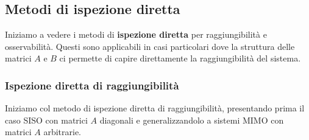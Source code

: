 \documentclass[a4paper,11pt]{article}
\begin{document}
\subsection{Metodi di ispezione diretta}
Iniziamo a vedere i metodi di \textbf{ispezione diretta} per raggiungibilità e osservabilità.
Questi sono applicabili in casi particolari dove la struttura delle matrici $A$ e $B$ ci permette di capire direttamente la raggiungibilità del sistema.

\subsubsection{Ispezione diretta di raggiungibilità}
Iniziamo col metodo di ispezione diretta di raggiungibilità, presentando prima il caso SISO con matrici $A$ diagonali e generalizzandolo a sistemi MIMO con matrici $A$ arbitrarie.
\end{document}
